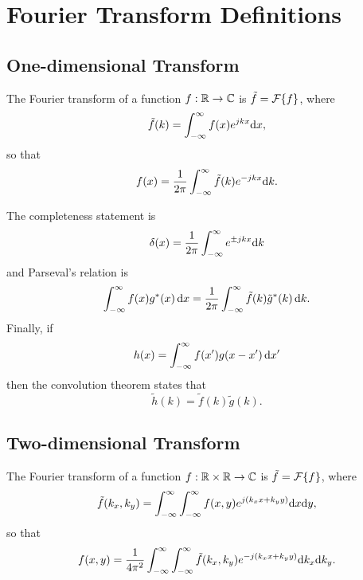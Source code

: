 \section{Fourier Transform Definitions}
\subsection{One-dimensional Transform}
The Fourier transform of a function $f: \mathbb{R} \rightarrow \mathbb{C}$
is $\tilde{f} = \mathcal{F} \{f\}$, where
\begin{equation}
  \tilde{f}(k) = \int_{-\infty}^{\infty} f(x) e^{jkx} \text{d} x,
\end{equation}
so that 
\begin{equation}
  f(x) = \frac{1}{2\pi} \int_{-\infty}^{\infty} \tilde{f}(k) e^{-jkx} \text{d} k.
\end{equation}

The completeness statement is
\begin{equation}
  \delta(x) = \frac{1}{2\pi} \int_{-\infty}^{\infty} e^{\pm jkx} \text{d} k
\end{equation}
and Parseval's relation is
\begin{equation}
\int_{-\infty}^{\infty} f(x) g^*(x) \, \text{d} x =   
\frac{1}{2\pi} \int_{-\infty}^{\infty} \tilde{f}(k) \tilde{g}^*(k) \, \text{d} k.
\end{equation}
Finally, if 
\begin{equation}
  h(x) = \int_{-\infty}^{\infty} f(x') g(x-x') \, \text{d} x'
\end{equation}
then the convolution theorem states that
\begin{equation}
  \tilde{h}(k) = \tilde{f}(k) \tilde{g}(k).
\end{equation}


\subsection{Two-dimensional Transform}
The Fourier transform of a function $f: \mathbb{R} \times \mathbb{R}
\rightarrow \mathbb{C}$
is $\tilde{f} = \mathcal{F} \{f\}$, where
\begin{equation}
  \tilde{f}(k_x,k_y) = 
  \int_{-\infty}^{\infty}\int_{-\infty}^{\infty} 
  f(x,y) e^{j(k_x x + k_y y)} \text{d} x  \text{d} y,
\end{equation}
so that 
\begin{equation}
  f(x,y) = \frac{1}{4\pi^2} 
  \int_{-\infty}^{\infty}\int_{-\infty}^{\infty}
 \tilde{f}(k_x,k_y) e^{-j(k_x x + k_y y)} \text{d} k_x  \text{d} k_y.
\end{equation}

